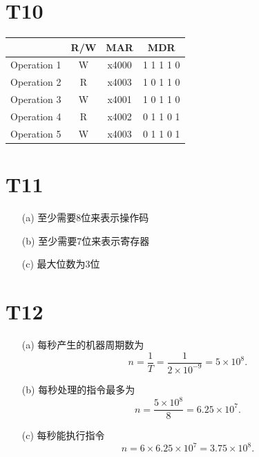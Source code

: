 \documentclass{article}
\begin{document}
\section*{T10}
    \begin{table}[!ht]
        \centering
        \begin{tabular}{|c|c|c|c|}
        \hline
            ~ & R/W & MAR & MDR  \\ \hline
            Operation 1 & W & x4000 & 1 1 1 1 0  \\ \hline
            Operation 2 & R & x4003 & 1 0 1 1 0  \\ \hline
            Operation 3 & W & x4001 & 1 0 1 1 0  \\ \hline
            Operation 4 & R & x4002 & 0 1 1 0 1  \\ \hline
            Operation 5 & W & x4003 & 0 1 1 0 1  \\ \hline
        \end{tabular}
    \end{table}
\section*{T11}
\begin{enumerate}
    \item [(a)]至少需要8位来表示操作码
    \item [(b)]至少需要7位来表示寄存器
    \item [(c)]最大位数为3位
\end{enumerate}
\section*{T12}
\begin{enumerate}
    \item [(a)]每秒产生的机器周期数为
    \[
        n=\displaystyle{\frac{1}{T}}
        =\displaystyle{\frac{1}{2\times 10^{-9}}}
        =5\times 10^{8}.
    \]
    \item [(b)]每秒处理的指令最多为
    \[
        n=\displaystyle{\frac{5\times 10^{8}}{8}}
        =6.25\times 10^{7}.
    \]
    \item [(c)]每秒能执行指令
    \[
        n=6\times 6.25\times 10^{7}
        =3.75\times 10^{8}.
    \]
\end{enumerate}
\end{document}
